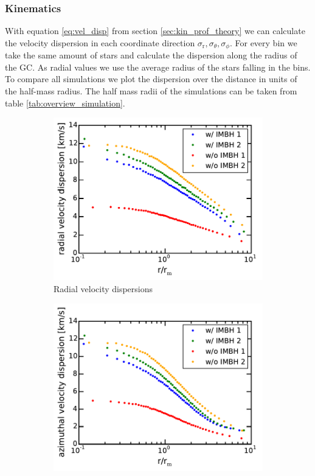 \subsubsection{Kinematics}\label{sec:kinematics}
With equation \eqref{eq:vel_disp} from section \ref{sec:kin_prof_theory} we can calculate the velocity dispersion in each coordinate direction \(\sigma_\mathrm{r},\sigma_\theta,\sigma_\phi\). For every bin we take the same amount of stars and calculate the dispersion along the radius of the \ac{GC}. As radial values we use the average radius of the stars falling in the bins. To compare all simulations we plot the dispersion over the distance in units of the half-mass radius. The half mass radii of the simulations can be taken from table \ref{tab:overview_simulation}. 
\begin{figure}[htbp]
	\centering
	\begin{subfigure}{0.475\textwidth}
		\centering
		\includegraphics[width=\textwidth]{Plots/radial_velocity_dispersion.pdf}
		\caption{Radial velocity dispersions}
		\label{fig:radial_vel_disp}
	\end{subfigure}
	\hfill
	\begin{subfigure}{0.475\textwidth}
		\centering
		\includegraphics[width=\textwidth]{Plots/azimuthal_velocity_dispersion.pdf}

\end{subfigure}
\end{figure}
